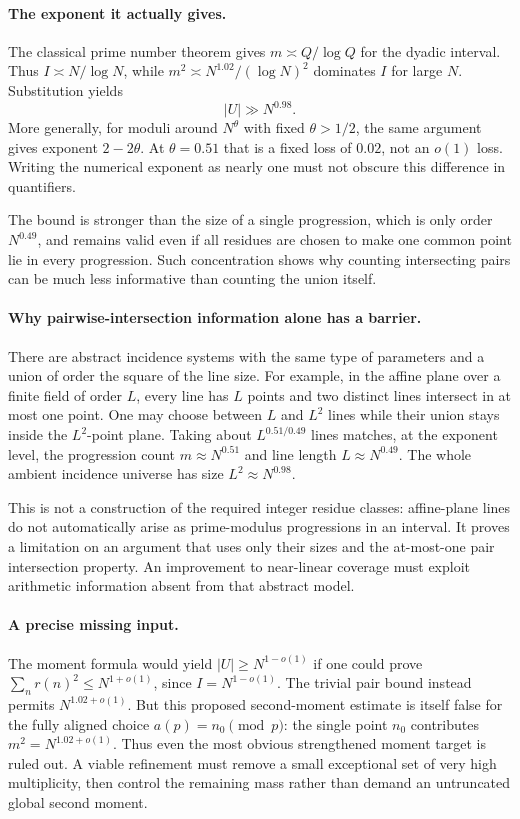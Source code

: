 \documentclass[11pt,a4paper]{article}
\begin{document}
\paragraph{The exponent it actually gives.}
The classical prime number theorem gives $m\asymp Q/\log Q$ for the dyadic interval. Thus $I\asymp N/\log N$, while $m^2\asymp N^{1.02}/(\log N)^2$ dominates $I$ for large $N$. Substitution yields
\[
 |U|\gg N^{0.98}.
\]
More generally, for moduli around $N^\theta$ with fixed $\theta>1/2$, the same argument gives exponent $2-2\theta$. At $\theta=0.51$ that is a fixed loss of $0.02$, not an $o(1)$ loss. Writing the numerical exponent as nearly one must not obscure this difference in quantifiers.

The bound is stronger than the size of a single progression, which is only order $N^{0.49}$, and remains valid even if all residues are chosen to make one common point lie in every progression. Such concentration shows why counting intersecting pairs can be much less informative than counting the union itself.

\paragraph{Why pairwise-intersection information alone has a barrier.}
There are abstract incidence systems with the same type of parameters and a union of order the square of the line size. For example, in the affine plane over a finite field of order $L$, every line has $L$ points and two distinct lines intersect in at most one point. One may choose between $L$ and $L^2$ lines while their union stays inside the $L^2$-point plane. Taking about $L^{0.51/0.49}$ lines matches, at the exponent level, the progression count $m\approx N^{0.51}$ and line length $L\approx N^{0.49}$. The whole ambient incidence universe has size $L^2\approx N^{0.98}$.

This is not a construction of the required integer residue classes: affine-plane lines do not automatically arise as prime-modulus progressions in an interval. It proves a limitation on an argument that uses only their sizes and the at-most-one pair intersection property. An improvement to near-linear coverage must exploit arithmetic information absent from that abstract model.

\paragraph{A precise missing input.}
The moment formula would yield $|U|\geq N^{1-o(1)}$ if one could prove $\sum_nr(n)^2\leq N^{1+o(1)}$, since $I=N^{1-o(1)}$. The trivial pair bound instead permits $N^{1.02+o(1)}$. But this proposed second-moment estimate is itself false for the fully aligned choice $a(p)=n_0\pmod p$: the single point $n_0$ contributes $m^2=N^{1.02+o(1)}$. Thus even the most obvious strengthened moment target is ruled out. A viable refinement must remove a small exceptional set of very high multiplicity, then control the remaining mass rather than demand an untruncated global second moment.
\end{document}
